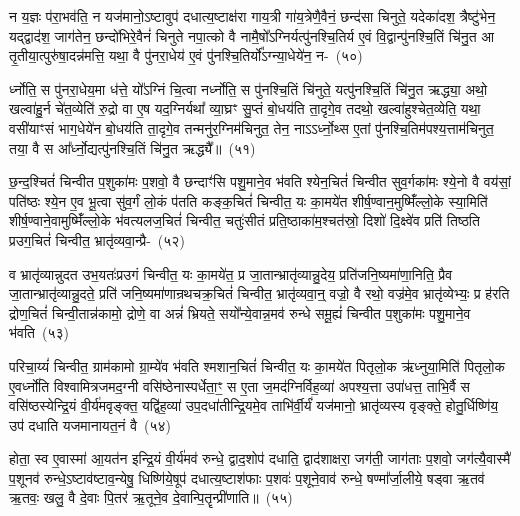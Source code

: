 न य॒ज्ञः प॑रा॒भव॑ति॒ न यज॑मानो॒\-ऽष्टावुप॑ दधात्य॒ष्टाक्ष॑रा गाय॒त्री गा॑य॒त्रेणै॒वैनं॒ छन्द॑सा चिनुते॒ यदेका॑\-दश॒ त्रैष्टु॑भेन॒ यद्द्वाद॑श॒ जाग॑तेन॒ छन्दो॑भिरे॒वैनं॑ चिनुते नपा॒त्को वै नामै॒षो᳚\-ऽग्निर्यत्पु॑नश्चि॒तिर्य ए॒वं वि॒द्वान्पु॑नश्चि॒तिं चि॑नु॒त आ तृ॒तीया॒त्पुरु॑षा॒दन्न॑मत्ति॒ यथा॒ वै पु॑नरा॒धेय॑ ए॒वं पु॑नश्चि॒तिर्यो᳚\-ऽग्न्या॒धेये॑न॒ न-~(५०)\ip

र्ध्नोति॒ स पु॑नरा॒धेय॒मा ध॑त्ते॒ यो᳚\-ऽग्निं चि॒त्वा नर्ध्नोति॒ स पु॑नश्चि॒तिं चि॑नुते॒ यत्पु॑नश्चि॒तिं चि॑नु॒त ऋद्ध्या॒ अथो॒ खल्वा॑हु॒र्न चे॑त॒व्येति॑ रु॒द्रो वा ए॒ष यद॒ग्निर्यथा᳚ व्या॒घ्रꣳ सु॒प्तं बो॒धय॑ति ता॒दृगे॒व तदथो॒ खल्वा॑हुश्चेत॒व्येति॒ यथा॒ वसी॑याꣳसं भाग॒\-धेये॑न बो॒धय॑ति ता॒दृगे॒व तन्मनु॑र॒ग्निम॑चिनुत॒ तेन॒ ना\-ऽऽर्ध्नो॒थ्स ए॒तां पु॑नश्चि॒तिम॑पश्य॒त्ताम॑चिनुत॒ तया॒ वै स आ᳚र्ध्नो॒द्यत्पु॑नश्चि॒तिं चि॑नु॒त ऋद्ध्यै᳚॥~(५१)\ip

{\anuvakamend[{त्रि॒वृदथ॒ तिष्ठ॑न्त्यग्न्या॒धेये॑न॒ नाचि॑नुत स॒प्तद॑श च}]}%

छ॒न्द॒श्चितं॑ चिन्वीत प॒शुका॑मः प॒शवो॒ वै छन्दाꣳ॑सि पशु॒माने॒व भ॑वति श्येन॒चितं॑ चिन्वीत सुव॒र्गका॑मः श्ये॒नो वै वय॑सां॒ पति॑ष्ठः श्ये॒न ए॒व भू॒त्वा सु॑व॒र्गं लो॒कं प॑तति कङ्क॒चितं॑ चिन्वीत॒ यः का॒मये॑त शीर्\mbox{}ष॒ण्वान॒मुष्मिँ॑ल्लो॒के स्या॒मिति॑ शीर्\mbox{}ष॒ण्वाने॒वामुष्मिँ॑ल्लो॒के भ॑वत्यलज॒चितं॑ चिन्वीत॒ चतुः॑सीतं प्रति॒ष्ठाका॑म॒श्चत॑स्रो॒ दिशो॑ दि॒क्ष्वे॑व प्रति॑ तिष्ठति प्रउग॒चितं॑ चिन्वीत॒ भ्रातृ॑व्यवा॒न्प्रै-~(५२)\ip

व भ्रातृ॑व्यान्नुदत उभ॒यतः॑प्रउगं चिन्वीत॒ यः का॒मये॑त॒ प्र जा॒तान्भ्रातृ॑व्यान्नु॒देय॒ प्रति॑जनि॒ष्यमा॑णा॒निति॒ प्रैव जा॒तान्भ्रातृ॑व्यान्नु॒दते॒ प्रति॑ जनि॒ष्यमा॑णान्रथचक्र॒चितं॑ चिन्वीत॒ भ्रातृ॑व्यवा॒न्॒ वज्रो॒ वै रथो॒ वज्र॑मे॒व भ्रातृ॑व्येभ्यः॒ प्र ह॑रति द्रोण॒चितं॑ चिन्वी॒तान्न॑कामो॒ द्रोणे॒ वा अन्नं॑ भ्रियते॒ सयो᳚न्ये॒वान्न॒मव॑ रुन्धे समू॒ह्यं॑ चिन्वीत प॒शुका॑मः पशु॒माने॒व भ॑वति~(५३)\ip

परिचा॒य्यं॑ चिन्वीत॒ ग्राम॑कामो ग्रा॒म्ये॑व भ॑वति श्मशान॒चितं॑ चिन्वीत॒ यः का॒मये॑त पितृलो॒क ऋ॑ध्नुया॒मिति॑ पितृलो॒क ए॒वर्ध्नो॑ति विश्वामित्रजमद॒ग्नी वसि॑ष्ठेनास्पर्धेता॒ꣳ॒ स ए॒ता ज॒मद॑ग्निर्विह॒व्या॑ अपश्य॒त्ता उपा॑धत्त॒ ताभि॒र्वै स वसि॑ष्ठस्येन्द्रि॒यं वी॒र्य॑मवृङ्क्त॒ यद्वि॑ह॒व्या॑ उप॒\-दधा॑तीन्द्रि॒यमे॒व ताभि॑र्वी॒र्यं॑ यज॑मानो॒ भ्रातृ॑व्यस्य वृङ्क्ते॒ होतु॒र्धिष्णि॑य॒ उप॑ दधाति यजमानायत॒नं वै~(५४)\ip

होता॒ स्व ए॒वास्मा॑ आ॒यत॑न इन्द्रि॒यं वी॒र्य॑मव॑ रुन्धे॒ द्वाद॒शोप॑ दधाति॒ द्वाद॑शाक्षरा॒ जग॑ती॒ जाग॑ताः प॒शवो॒ जग॑त्यै॒वास्मै॑ प॒शूनव॑ रुन्धे॒\-ऽष्टाव॑ष्टाव॒न्येषु॒ धिष्णि॑ये॒षूप॑ दधात्य॒ष्टाश॑फाः प॒शवः॑ प॒शूने॒वाव॑ रुन्धे॒ षण्मा᳚र्जा॒लीये॒ षड्वा ऋ॒तव॑ ऋ॒तवः॒ खलु॒ वै दे॒वाः पि॒तर॑ ऋ॒तूने॒व दे॒वान्पि॒तॄन्प्री॑णाति॥~(५५)\ip

